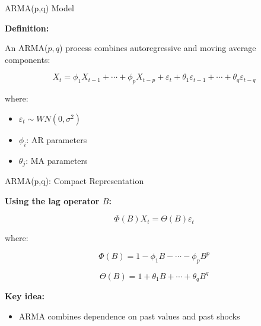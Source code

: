 \documentclass[aspectratio=169]{beamer}
\begin{document}
\begin{frame}{ARMA(p,q) Model}

\textbf{Definition:}

\vspace{0.3cm}

An ARMA($p,q$) process combines autoregressive and moving average components:

\[
X_t = \phi_1 X_{t-1} + \cdots + \phi_p X_{t-p}
+ \varepsilon_t + \theta_1 \varepsilon_{t-1} + \cdots + \theta_q \varepsilon_{t-q}
\]

\vspace{0.3cm}

where:
\begin{itemize}
    \item $\varepsilon_t \sim WN(0,\sigma^2)$
    \item $\phi_i$: AR parameters
    \item $\theta_j$: MA parameters
\end{itemize}

\end{frame}

\begin{frame}{ARMA(p,q): Compact Representation}

\textbf{Using the lag operator $B$:}

\vspace{0.3cm}

\[
\Phi(B)X_t = \Theta(B)\varepsilon_t
\]

\vspace{0.3cm}

where:

\[
\Phi(B) = 1 - \phi_1 B - \cdots - \phi_p B^p
\]

\[
\Theta(B) = 1 + \theta_1 B + \cdots + \theta_q B^q
\]

\vspace{0.4cm}

\textbf{Key idea:}
\begin{itemize}
    \item ARMA combines dependence on past values and past shocks
\end{itemize}

\end{frame}
\end{document}
